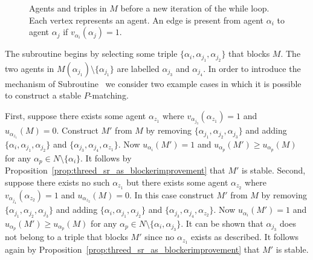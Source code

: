 \begin{figure}
    \centering
    
    \caption[Agents and triples in $M$ before a new iteration of the while loop]{Agents and triples in $M$ before a new iteration of the while loop. Each vertex represents an agent. An edge is present from agent $\alpha_i$ to agent $\alpha_j$ if $v_{\alpha_i}(\alpha_j) = 1$.} 
    \label{fig:threed_sr_as_symmetric_binary_repair_algorithm_7_cases_original_case}
\end{figure}

The subroutine begins by selecting some triple $\{ \alpha_i, \alpha_{j_1}, \alpha_{j_2} \}$ that blocks $M$. The two agents in $M(\alpha_{j_1}) \setminus \{ \alpha_{j_1} \}$ are labelled $\alpha_{j_3}$ and $\alpha_{j_4}$. In order to introduce the mechanism of Subroutine~ we consider two example cases in which it is possible to construct a stable $P$\nobreakdash-matching. 

First, suppose there exists some agent $\alpha_{z_1}$ where $v_{\alpha_{j_3}}(\alpha_{z_1})=1$ and $u_{\alpha_{z_1}}(M)=0$.  Construct $M'$ from $M$ by removing $\{ \alpha_{j_1}, \alpha_{j_2}, \alpha_{j_3} \}$ and adding $\{ \alpha_i, \alpha_{j_1}, \alpha_{j_2} \}$ and $\{ \alpha_{j_3}, \alpha_{j_4}, \alpha_{z_1} \}$. Now $u_{\alpha_i}(M')=1$ and $u_{\alpha_p}(M')\geq u_{\alpha_p}(M)$ for any $\alpha_p \in N\setminus \{ \alpha_i \}$. It follows by Proposition~\ref{prop:threed_sr_as_blockerimprovement} that $M'$ is stable. Second, suppose there exists no such $\alpha_{z_1}$ but there exists some agent $\alpha_{z_2}$ where $v_{\alpha_{j_4}}(\alpha_{z_2})=1$ and $u_{\alpha_{z_2}}(M)=0$. In this case construct $M'$ from $M$ by removing $\{ \alpha_{j_1}, \alpha_{j_2}, \alpha_{j_3} \}$ and adding $\{ \alpha_i, \alpha_{j_1}, \alpha_{j_2} \}$ and $\{ \alpha_{j_3}, \alpha_{j_4}, \alpha_{z_2} \}$. Now $u_{\alpha_i}(M')=1$ and $u_{\alpha_p}(M')\geq u_{\alpha_p}(M)$ for any $\alpha_p \in N\setminus \{ \alpha_i, \alpha_{j_3} \}$. It can be shown that $\alpha_{j_3}$ does not belong to a triple that blocks $M'$ since no $\alpha_{z_1}$ exists as described. It follows again by Proposition~\ref{prop:threed_sr_as_blockerimprovement} that $M'$ is stable.

